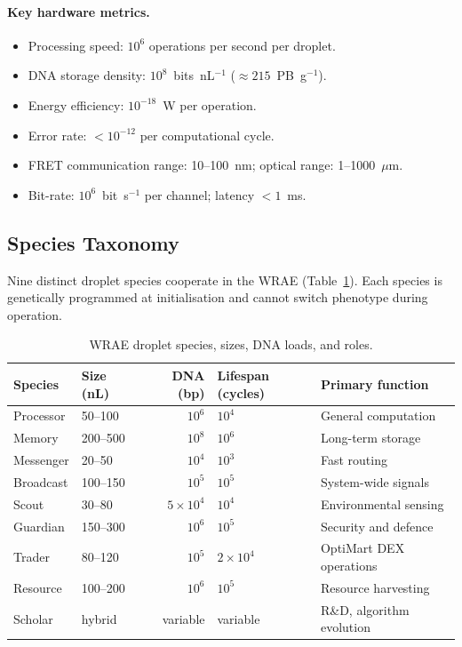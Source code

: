 \documentclass[12pt,a4paper]{article}
\begin{document}
\paragraph{Key hardware metrics.}

\begin{itemize}
\item Processing speed: $10^6$ operations per second per droplet.
\item DNA storage density: $10^8$~bits~nL$^{-1}$ ($\approx 215$~PB~g$^{-1}$).
\item Energy efficiency: $10^{-18}$~W per operation.
\item Error rate: $<10^{-12}$ per computational cycle.
\item FRET communication range: 10--100~nm; optical range: 1--1000~$\mu$m.
\item Bit-rate: $10^6$~bit~s$^{-1}$ per channel; latency $<1$~ms.
\end{itemize}

\subsection{Species Taxonomy}
\label{sec:taxonomy}

Nine distinct droplet species cooperate in the WRAE (Table~\ref{tab:species}).
Each species is genetically programmed at initialisation and cannot switch
phenotype during operation.

\begin{table}[ht]
\centering
\caption{WRAE droplet species, sizes, DNA loads, and roles.}
\label{tab:species}
\begin{tabular}{llrlp{4.5cm}}
\toprule
\textbf{Species} & \textbf{Size (nL)} & \textbf{DNA (bp)} & \textbf{Lifespan (cycles)} & \textbf{Primary function} \\
\midrule
Processor    & 50--100  & $10^6$ & $10^4$ & General computation \\
Memory       & 200--500 & $10^8$ & $10^6$ & Long-term storage \\
Messenger    & 20--50   & $10^4$ & $10^3$ & Fast routing \\
Broadcast    & 100--150 & $10^5$ & $10^5$ & System-wide signals \\
Scout        & 30--80   & $5{\times}10^4$ & $10^4$ & Environmental sensing \\
Guardian     & 150--300 & $10^6$ & $10^5$ & Security and defence \\
Trader       & 80--120  & $10^5$ & $2{\times}10^4$ & OptiMart DEX operations \\
Resource     & 100--200 & $10^6$ & $10^5$ & Resource harvesting \\
Scholar      & hybrid   & variable & variable & R\&D, algorithm evolution \\
\bottomrule
\end{tabular}
\end{table}
\end{document}
